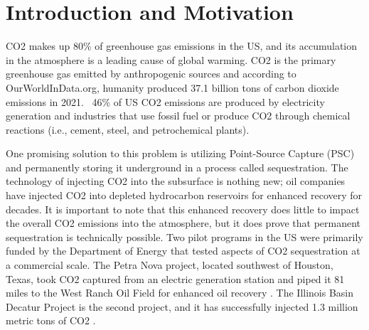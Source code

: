 \documentclass[balance,upint,subscriptcorrection,varvw,mathalfa=cal=boondoxo,spanish,french,vietnamese,russian,greek,pdf-a,colorlinks]{asmeconf}
\begin{document}





\section{Introduction and Motivation}
CO2 makes up 80\% of greenhouse gas emissions in the US, and its accumulation in the atmosphere is a leading cause of global warming. CO2 is the primary greenhouse gas emitted by anthropogenic sources and according to OurWorldInData.org, humanity produced 37.1 billion tons of carbon dioxide emissions in 2021. ~46\% of US CO2 emissions are produced by electricity generation and industries that use fossil fuel or produce CO2 through chemical reactions (i.e., cement, steel, and petrochemical plants). \cite{EPA_2017}

One promising solution to this problem is utilizing Point-Source Capture (PSC) and permanently storing it underground in a process called sequestration. The technology of injecting CO2 into the subsurface is nothing new; oil companies have injected CO2 into depleted hydrocarbon reservoirs for enhanced recovery for decades. It is important to note that this enhanced recovery does little to impact the overall CO2 emissions into the atmosphere, but it does prove that permanent sequestration is technically possible. Two pilot programs in the US were primarily funded by the Department of Energy that tested aspects of CO2 sequestration at a commercial scale. The Petra Nova project, located southwest of Houston, Texas, took CO2 captured from an electric generation station and piped it 81 miles to the West Ranch Oil Field for enhanced oil recovery \cite{Smyth2020}. The Illinois Basin Decatur Project is the second project, and it has successfully injected 1.3 million metric tons of CO2 \cite{IBDP2017}.
\end{document}
